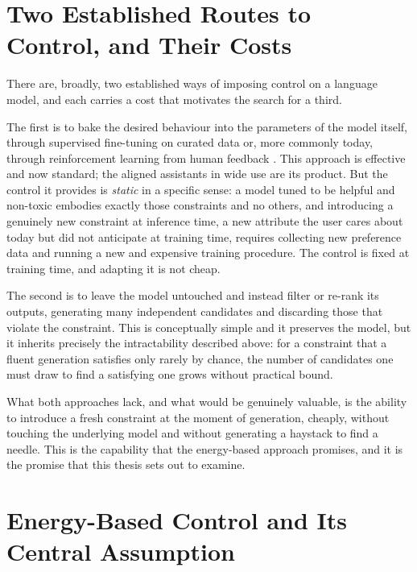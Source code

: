 \section{Two Established Routes to Control, and Their Costs}
\label{sec:intro-routes}

There are, broadly, two established ways of imposing control on a language model, and each carries a cost that motivates the search for a third.

The first is to bake the desired behaviour into the parameters of the model itself, through supervised fine-tuning on curated data or, more commonly today, through reinforcement learning from human feedback \citep{ouyang2022training}. This approach is effective and now standard; the aligned assistants in wide use are its product. But the control it provides is \emph{static} in a specific sense: a model tuned to be helpful and non-toxic embodies exactly those constraints and no others, and introducing a genuinely new constraint at inference time, a new attribute the user cares about today but did not anticipate at training time, requires collecting new preference data and running a new and expensive training procedure. The control is fixed at training time, and adapting it is not cheap.

The second is to leave the model untouched and instead filter or re-rank its outputs, generating many independent candidates and discarding those that violate the constraint. This is conceptually simple and it preserves the model, but it inherits precisely the intractability described above: for a constraint that a fluent generation satisfies only rarely by chance, the number of candidates one must draw to find a satisfying one grows without practical bound.

What both approaches lack, and what would be genuinely valuable, is the ability to introduce a fresh constraint at the moment of generation, cheaply, without touching the underlying model and without generating a haystack to find a needle. This is the capability that the energy-based approach promises, and it is the promise that this thesis sets out to examine.

\section{Energy-Based Control and Its Central Assumption}
\label{sec:intro-ebm}

